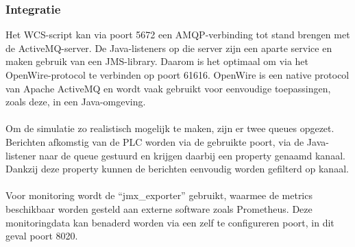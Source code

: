 \subsubsection{Integratie}
Het WCS-script kan via poort 5672 een AMQP-verbinding tot stand brengen met de ActiveMQ-server.
De Java-listeners op die server zijn een aparte service en maken gebruik van een JMS-library. 
Daarom is het optimaal om via het OpenWire-protocol te verbinden op poort 61616. 
OpenWire is een native protocol van Apache ActiveMQ en wordt vaak gebruikt voor eenvoudige toepassingen, zoals deze, in een Java-omgeving.
\\\\
Om de simulatie zo realistisch mogelijk te maken, zijn er twee queues opgezet. 
Berichten afkomstig van de PLC worden via de gebruikte poort, via de Java-listener naar de queue gestuurd en krijgen daarbij een property genaamd kanaal.
Dankzij deze property kunnen de berichten eenvoudig worden gefilterd op kanaal. 
\\\\
Voor monitoring wordt de ``jmx\_exporter'' gebruikt, waarmee de metrics beschikbaar worden gesteld aan externe software zoals Prometheus. 
Deze monitoringdata kan benaderd worden via een zelf te configureren poort, in dit geval poort 8020.

